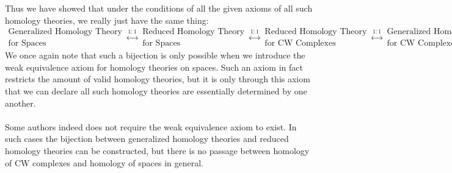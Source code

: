 \documentclass[a4paper]{article}
\begin{document}
Thus we have showed that under the conditions of all the given axioms of all such homology theories, we really just have the same thing: $$\substack{\text{Generalized  Homology Theory}\\\text{for Spaces}}\overset{1:1}{\longleftrightarrow}\substack{\text{Reduced Homology Theory}\\\text{for Spaces}}\overset{1:1}{\longleftrightarrow}\substack{\text{Reduced Homology Theory}\\\text{for CW Complexes}}\overset{1:1}{\longleftrightarrow}\substack{\text{Generalized Homology Theory}\\\text{for CW Complexes}}$$ We once again note that such a bijection is only possible when we introduce the weak equivalence axiom for homology theories on spaces. Such an axiom in fact restricts the amount of valid homology theories, but it is only through this axiom that we can declare all such homology theories are essentially determined by one another. \\~\\

Some authors indeed does not require the weak equivalence axiom to exist. In such cases the bijection between generalized homology theories and reduced homology theories can be constructed, but there is no passage between homology of CW complexes and homology of spaces in general. 
\end{document}
